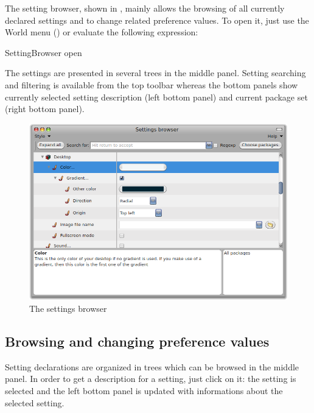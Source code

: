 \documentclass[a4paper,10pt,twoside]{book}
\begin{document}
The setting browser, shown in , mainly allows the browsing of all currently declared settings and to change related preference values. To open it, just use the World menu () or evaluate the following expression:
\begin{code}{}
SettingBrowser open
\end{code}
The settings are presented in several trees in the middle panel. Setting searching and filtering is available from the top toolbar whereas the bottom panels show currently selected setting description (left bottom panel) and current package set (right bottom panel). 
\begin{figure}[tbh]
\begin{center}
\includegraphics[scale=0.3]{SettingBrowser}
\caption{The settings browser}
\end{center}
\end{figure}

\subsection{Browsing and changing preference values}
Setting declarations are organized in trees which can be browsed in the middle panel. In order to get a description for a setting, just click on it: the setting is selected and the left bottom panel is updated with informations about the selected setting. 
\end{document}

